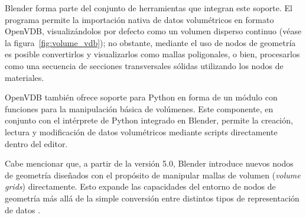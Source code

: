Blender forma parte del conjunto de herramientas que integran este soporte. El programa permite la importación nativa de datos volumétricos 
en formato OpenVDB, visualizándolos por defecto como un volumen disperso continuo (véase la figura~\ref{fig:volume_vdb}); no obstante, 
mediante el uso de nodos de geometría es posible convertirlos y visualizarlos como mallas poligonales, 
o bien, procesarlos como una secuencia de secciones transversales sólidas utilizando los nodos de 
materiales. 
\medskip

OpenVDB también ofrece soporte para Python en forma de un módulo con funciones para la
manipulación básica de volúmenes. Este componente, en conjunto con el intérprete de Python integrado en Blender, 
permite la creación, lectura y modificación de datos volumétricos mediante scripts directamente dentro del editor.
\medskip

Cabe mencionar que, a partir de la versión 5.0, Blender introduce nuevos nodos de geometría diseñados con el propósito de
manipular mallas de volumen (\textit{volume grids}) directamente. Esto expande las capacidades del entorno de nodos de geometría 
más allá de la simple conversión entre distintos tipos de representación de datos \parencite{goudey_volume_grids}.
